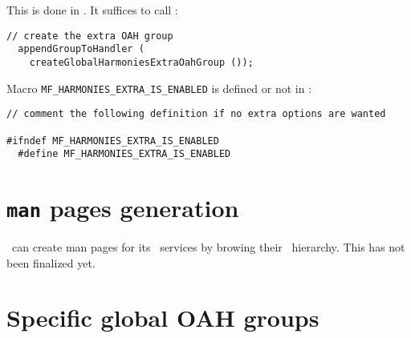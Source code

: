 This is done in . It suffices to call :
\begin{lstlisting}[language=CPlusPlus]
  // create the extra OAH group
  appendGroupToHandler (
    createGlobalHarmoniesExtraOahGroup ());
\end{lstlisting}

Macro {\tt MF_HARMONIES_EXTRA_IS_ENABLED} is defined or not in :
\begin{lstlisting}[language=CPlusPlus]
// comment the following definition if no extra options are wanted

#ifndef MF_HARMONIES_EXTRA_IS_ENABLED
  #define MF_HARMONIES_EXTRA_IS_ENABLED
\end{lstlisting}


%


\section{{\tt man} pages generation}

\mf\ can create man pages for its \CLI\ services by browing their \oahRepr\ hierarchy. This has not been finalized yet.%


\section{Specific global OAH groups}

